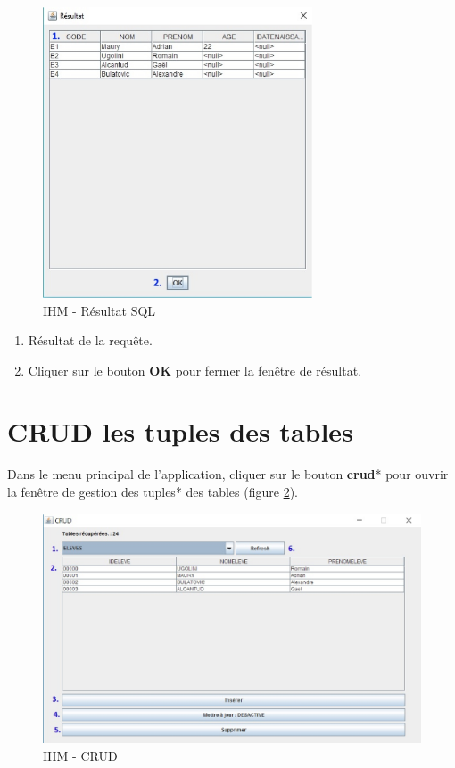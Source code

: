 \begin{figure}[!h]
\centering
\includegraphics[width=8cm]{./images/manuel/sql_result.eps}
\caption{IHM - Résultat SQL}
\label{sql_result_gui}
\end{figure}

\begin{enumerate}
\item Résultat de la requ\^ete.
\item Cliquer sur le bouton \textbf{OK} pour fermer la fenêtre de résultat.
\end{enumerate}

\section{CRUD les tuples des tables}
Dans le menu principal de l'application, cliquer sur le bouton \textbf{\gls{crud}}* pour ouvrir la fen\^etre de gestion des \glspl{tuple}* des tables (figure \ref{crud_gui}).
\begin{figure}[!h]
\centering
\includegraphics[width=12cm]{./images/manuel/crud.eps}
\caption{IHM - CRUD}
\label{crud_gui}
\end{figure}


